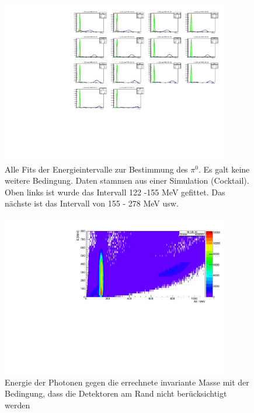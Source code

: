\documentclass[a4paper,11pt,oneside,final,german,openbib,pdftex]{scrbook}
\begin{document}
{\begin{appendix}
\begin{figure}
	\begin{center}
		\includegraphics[width=100mm]{NoEdgeAngleAllFits1403}
		\caption{Alle Fits der Energieintervalle zur Bestimmung des $\pi^0$. Es galt keine weitere Bedingung. Daten stammen aus einer Simulation (Cocktail). Oben links ist wurde das Intervall 122 -155 MeV gefittet. Das nächste ist das Intervall von 155 - 278 MeV usw.}
	\end{center}
\end{figure}

\begin{figure}[h!]
	\begin{center}
		\includegraphics[width=100mm]{30DegreeEdge1403}
		\caption{Energie der Photonen gegen die errechnete invariante Masse mit der Bedingung, dass die Detektoren am Rand nicht ber\"ucksichtigt werden}
		\label{fig:Energy-Intervall-2D-Hist-30-Edge-1403}
	\end{center}
\end{figure}


\end{appendix}}
\end{document}
